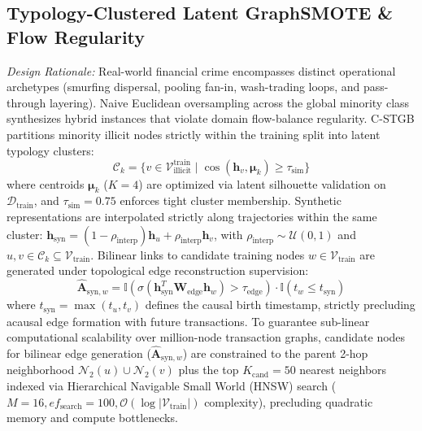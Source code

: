 \subsection{Typology-Clustered Latent GraphSMOTE \& Flow Regularity}
\label{sec:graph_smote}
\textit{Design Rationale:} Real-world financial crime encompasses distinct operational archetypes (smurfing dispersal, pooling fan-in, wash-trading loops, and pass-through layering). Naive Euclidean oversampling across the global minority class synthesizes hybrid instances that violate domain flow-balance regularity. C-STGB partitions minority illicit nodes strictly within the training split into latent typology clusters:
\begin{equation}
\mathcal{C}_k = \{ v \in \mathcal{V}_{\text{illicit}}^{\text{train}} \mid \cos(\mathbf{h}_v, \boldsymbol{\mu}_k) \ge \tau_{\text{sim}} \}
\end{equation}
where centroids $\boldsymbol{\mu}_k$ ($K=4$) are optimized via latent silhouette validation on $\mathcal{D}_{\text{train}}$, and $\tau_{\text{sim}} = 0.75$ enforces tight cluster membership. Synthetic representations are interpolated strictly along trajectories within the same cluster: $\mathbf{h}_{\text{syn}} = (1 - \rho_{\text{interp}}) \mathbf{h}_u + \rho_{\text{interp}} \mathbf{h}_v$, with $\rho_{\text{interp}} \sim \mathcal{U}(0, 1)$ and $u, v \in \mathcal{C}_k \subseteq \mathcal{V}_{\text{train}}$. Bilinear links to candidate training nodes $w \in \mathcal{V}_{\text{train}}$ are generated under topological edge reconstruction supervision:
\begin{equation}
\hat{\mathbf{A}}_{\text{syn}, w} = \mathbb{I}\left( \sigma\left( \mathbf{h}_{\text{syn}}^T \mathbf{W}_{\text{edge}} \mathbf{h}_w \right) > \tau_{\text{edge}} \right) \cdot \mathbb{I}(t_w \le t_{\text{syn}})
\end{equation}
where $t_{\text{syn}} = \max(t_u, t_v)$ defines the causal birth timestamp, strictly precluding acausal edge formation with future transactions. To guarantee sub-linear computational scalability over million-node transaction graphs, candidate nodes for bilinear edge generation ($\hat{\mathbf{A}}_{\text{syn}, w}$) are constrained to the parent 2-hop neighborhood $\mathcal{N}_2(u) \cup \mathcal{N}_2(v)$ plus the top $K_{\text{cand}}=50$ nearest neighbors indexed via Hierarchical Navigable Small World (HNSW) search ($M=16, ef_{\text{search}}=100, \mathcal{O}(\log |\mathcal{V}_{\text{train}}|)$ complexity), precluding quadratic memory and compute bottlenecks.

